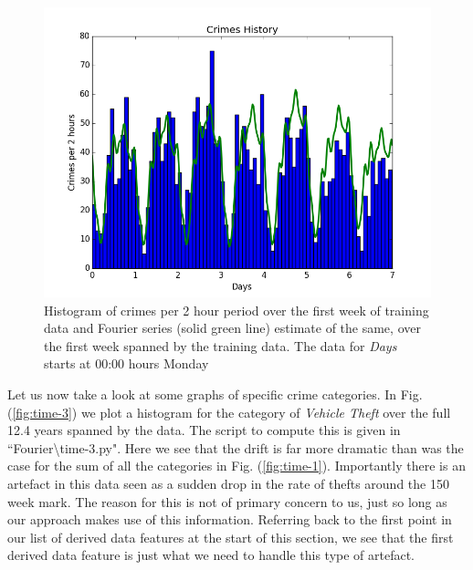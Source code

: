 \documentclass[12pt,notitlepage]{article}
\begin{document}
\begin{figure}
\centering{}\includegraphics[scale=0.7]{time-2}\caption{ Histogram of crimes per 2 hour period over the first week of training data and Fourier series 
(solid green line) estimate of the same, over the first week spanned by the training data. The data for \emph{Days} starts at 00:00 hours Monday\label{fig:time-2}}
\end{figure}
%
Let us now take a look at some graphs of specific crime categories. In Fig. (\ref{fig:time-3}) we plot a histogram for the category of \emph{Vehicle Theft} over the full 12.4 years spanned by the data. The script to compute this is given in ``Fourier\textbackslash time-3.py". Here we see that the drift is far more dramatic than was the case for the sum of all the categories in Fig. (\ref{fig:time-1}). Importantly there is an artefact in this data seen as a sudden drop in the rate of thefts around the 150 week mark. The reason for this is not of primary concern to us, just so long as our approach makes use of this information. Referring back to the first point in our list of derived data features at the start of this section, we see that the first derived data feature is just what we need to handle this type of artefact. 
\end{document}
